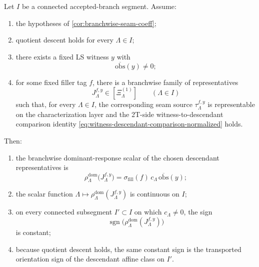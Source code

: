 \documentclass[11pt]{article}
\begin{document}
\begin{theorem}
\label{thm:branchwise-seam-witness}
Let \(I\) be a connected accepted-branch segment.
Assume:
\begin{enumerate}[leftmargin=2em]
\item the hypotheses of \cref{cor:branchwise-seam-coeff};
\item quotient descent holds for every \(\Lambda\in I\);
\item there exists a fixed LS witness \(y\) with
  \[
  \overline{\mathrm{obs}}(y)\neq 0;
  \]
\item for some fixed filler tag \(f\), there is a branchwise family of representatives
  \[
  J^{f,y}_{\Lambda}\in[\Xi^{(1)}_{\Lambda}]
  \qquad
  (\Lambda\in I)
  \]
  such that, for every \(\Lambda\in I\), the corresponding seam source
  \(\tau^{f,y}_{\Lambda}\) is representable on the characterization layer and the 2T-side
  witness-to-descendant comparison identity
  \eqref{eq:witness-descendant-comparison-normalized} holds.
\end{enumerate}
Then:
\begin{enumerate}[leftmargin=2em]
\item the branchwise dominant-response scalar of the chosen descendant representatives is
  \begin{equation}
  \rho^{\mathrm{dom}}_{\Lambda}\!\big(J^{f,y}_{\Lambda}\big)
  =
  \sigma_{\mathrm{fill}}(f)\,
  c_\Lambda\,
  \overline{\mathrm{obs}}(y);
  \label{eq:branchwise-seam-descendant-scalar}
  \end{equation}
\item the scalar function
  \(
  \Lambda\mapsto \rho^{\mathrm{dom}}_{\Lambda}(J^{f,y}_{\Lambda})
  \)
  is continuous on \(I\);
\item on every connected subsegment \(I'\subset I\) on which \(c_\Lambda\neq 0\), the sign
  \[
  \operatorname{sgn}\!\big(
  \rho^{\mathrm{dom}}_{\Lambda}(J^{f,y}_{\Lambda})
  \big)
  \]
  is constant;
\item because quotient descent holds, the same constant sign is the transported orientation sign of
  the descendant affine class on \(I'\).
\end{enumerate}
\end{theorem}
\end{document}

